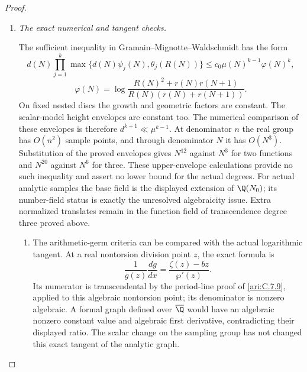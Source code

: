\begin{proof}
\begin{enumerate}[label=\arabic*.,leftmargin=0pt,labelsep=.5em]
\begin{enumerate}[label={$\langle2\rangle$\arabic*.},leftmargin=1.3em,labelsep=.5em]
 
\end{enumerate}

\item \emph{The exact numerical and tangent checks.}\par
The sufficient inequality in Gramain--Mignotte--Waldschmidt
\citep[Theorem2.1,pp.101--102]{gramain1986values} has the form
\[
 d(N)\prod_{j=1}^k\max\{d(N)\psi_j(N),\theta_j(R(N))\}
 \le c_0\mu(N)^{k-1}\varphi(N)^k,
\]
\[
 \varphi(N)=\log\frac{R(N)^2+r(N)r(N+1)}
                         {R(N)(r(N)+r(N+1))}.
\]
On fixed nested discs the growth and geometric factors are
constant. The scalar-model height envelopes are constant too.
The numerical comparison of these envelopes is therefore
$d^{k+1}\ll\mu^{k-1}$. At denominator $n$ the real group
has $O(n^2)$ sample points, and through denominator $N$ it
has $O(N^3)$. Substitution of the proved envelopes gives
$N^{12}$ against $N^3$ for two functions and $N^{20}$ against
$N^6$ for three. These upper-envelope calculations provide
no such inequality and assert no lower bound for the actual
degrees. For actual analytic samples the base field is the
displayed extension of $\Q(N_0)$; its number-field status is
exactly the unresolved algebraicity issue. Extra normalized
translates remain in the function field of transcendence degree
three proved above.


\begin{enumerate}[label={$\langle2\rangle$\arabic*.},leftmargin=1.3em,labelsep=.5em]
\item  The arithmetic-germ criteria
\citep[Theorem6.1]{herblot2012meromorphic}
\citep[Theorem4.16]{gasbarri2010analytic}
can be compared with the actual logarithmic tangent. At a real
nontorsion division point $z$, the exact formula is
\[
 \frac1{g(z)}\frac{dg}{dx}
       =\frac{\zeta(z)-bz}{\wp'(z)}.
\]
Its numerator is transcendental by the period-line proof of
\ref{ari:C.7.9}, applied to this algebraic nontorsion point;
its denominator is nonzero algebraic. A formal graph defined
over $\overline\Q$ would have an algebraic nonzero constant
value and algebraic first derivative, contradicting their
displayed ratio. The scalar change on the sampling group has
not changed this exact tangent of the analytic graph.



\end{enumerate}
\end{enumerate}
\end{proof}
